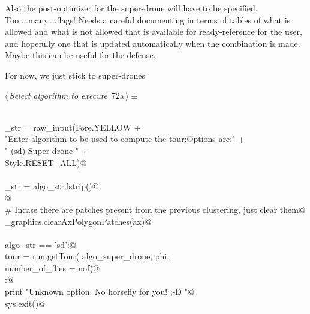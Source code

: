 \documentclass[11.5pt]{report}
\begin{document}
Also the post-optimizer for the super-drone will have to be specified. Too....many....flags! 
Needs a careful documenting in terms of tables of what is allowed and what is not allowed
that is available for ready-reference for the user, and hopefully one that is updated
automatically when the combination is made. Maybe this can be useful for the defense.  

For now, we just stick to super-drones

\begin{flushleft} \small
\begin{minipage}{\linewidth}\label{scrap105}\raggedright\small
{} $\langle\,${\itshape Select algorithm to execute}\nobreak\ {\footnotesize {72a}}$\,\rangle\equiv$
\vspace{-1ex}
\begin{list}{}{} \item
\mbox{}\verb@@\\
\mbox{}\verb@algo_str = raw_input(Fore.YELLOW                                             +\@\\
\mbox{}\verb@        "Enter algorithm to be used to compute the tour:\n Options are:\n"   +\@\\
\mbox{}\verb@        " (sd)   Super-drone \n"                                           +\@\\
\mbox{}\verb@        Style.RESET_ALL)@\\
\mbox{}\verb@@\\
\mbox{}\verb@algo_str = algo_str.lstrip()@\\
\mbox{}\verb@ @\\
\mbox{}\verb@# Incase there are patches present from the previous clustering, just clear them@\\
\mbox{}\verb@utils_graphics.clearAxPolygonPatches(ax)@\\
\mbox{}\verb@@\\
\mbox{}\verb@if   algo_str == 'sd':@\\
\mbox{}\verb@      tour = run.getTour( algo_super_drone, phi, \@\\
\mbox{}\verb@                          number_of_flies = nof)@\\
\mbox{}\verb@else:@\\
\mbox{}\verb@      print "Unknown option. No horsefly for you! ;-D "@\\
\mbox{}\verb@      sys.exit()@\\
\mbox{}\verb@@\\
\mbox{}\verb@@\\

\end{list}
\end{minipage}
\end{flushleft}
\end{document}
